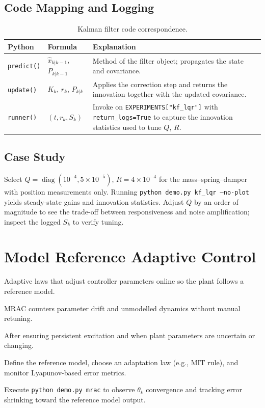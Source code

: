 \subsection{Code Mapping and Logging}
\begin{table}[h]
    \centering
    \small
    \renewcommand{\arraystretch}{1.2}
    \begin{tabularx}{\linewidth}{|>{\raggedright\arraybackslash}p{4cm}|X|X|}
        \hline
        \textbf{Python} & \textbf{Formula} & \textbf{Explanation} \\
        \hline
        \texttt{predict()} & $\hat{x}_{k|k-1}$, $P_{k|k-1}$ & Method of the filter object; propagates the state and covariance. \\
        \hline
        \texttt{update()} & $K_k$, $r_k$, $P_{k|k}$ & Applies the correction step and returns the innovation together with the updated covariance. \\
        \hline
        \texttt{runner()} & $(t, r_k, S_k)$ & Invoke on \texttt{EXPERIMENTS["kf\_lqr"]} with \texttt{return\_logs=True} to capture the innovation statistics used to tune $Q$, $R$. \\
        \hline
    \end{tabularx}
    \caption{Kalman filter code correspondence.}
\end{table}

\subsection{Case Study}
Select $Q = \operatorname{diag}(10^{-4}, 5\times 10^{-5})$, $R = 4\times 10^{-4}$ for the mass--spring--damper with position measurements only. Running \texttt{python demo.py kf\_lqr --no-plot} yields steady-state gains and innovation statistics. Adjust $Q$ by an order of magnitude to see the trade-off between responsiveness and noise amplification; inspect the logged $S_k$ to verify tuning.

\section{Model Reference Adaptive Control}
\begin{beginnerguide}
    \item[\textbf{What?}] Adaptive laws that adjust controller parameters online so the plant follows a reference model.
    \item[\textbf{Why?}] MRAC counters parameter drift and unmodelled dynamics without manual retuning.
    \item[\textbf{When?}] After ensuring persistent excitation and when plant parameters are uncertain or changing.
    \item[\textbf{How?}] Define the reference model, choose an adaptation law (e.g., MIT rule), and monitor Lyapunov-based error metrics.
    \item[\textbf{Example}] Execute \texttt{python demo.py mrac} to observe $\theta_k$ convergence and tracking error shrinking toward the reference model output.
\end{beginnerguide}
